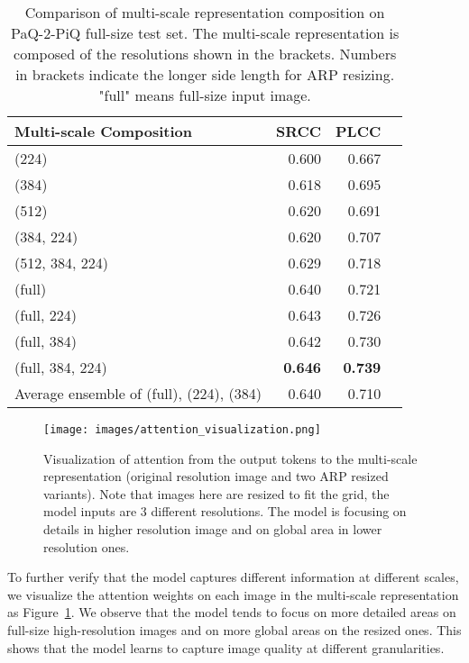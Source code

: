 \begin{table}[!tp]
\footnotesize
\begin{center}
\begin{tabular}{lrrr}\toprule
Multi-scale Composition &SRCC &PLCC \\\midrule
(224) &0.600 &0.667 \\
(384) &0.618 &0.695 \\
(512) &0.620 &0.691 \\
(384, 224) &0.620 &0.707 \\
(512, 384, 224) &0.629 &0.718 \\\midrule
(full) &0.640 &0.721 \\
(full, 224) &0.643 &0.726 \\
(full, 384) &0.642 &0.730 \\
(full, 384, 224) &\textbf{0.646} &\textbf{0.739} \\\midrule
Average ensemble of (full), (224), (384) &0.640 &0.710 \\
\bottomrule
\end{tabular}
\end{center}
\vspace{-2mm}
\caption{Comparison of multi-scale representation composition on PaQ-2-PiQ full-size test set. The multi-scale representation is composed of the resolutions shown in the brackets. Numbers in brackets indicate the longer side length  for ARP resizing. "full" means full-size input image.  }\label{tab:multi-scale-composition}
\vspace{-3mm}
\end{table}

\begin{figure}[!tp]
\centering
\texttt{[image: images/attention\_visualization.png]}
\caption{Visualization of attention from the output tokens to the multi-scale representation (original resolution image and two ARP resized variants). Note that images here are resized to fit the grid, the model inputs are 3 different resolutions. The model is focusing on details in higher resolution image and on global area in lower resolution ones.}\vspace{-2mm}
\label{fig:attention_visualization} 
\end{figure}

To further verify that the model captures different information at different scales, we visualize the attention weights on each image in the multi-scale representation as Figure~\ref{fig:attention_visualization}. We observe that the model tends to focus on more detailed areas on full-size high-resolution images and on more global areas on the resized ones. This shows that the model learns to capture image quality at different granularities.


